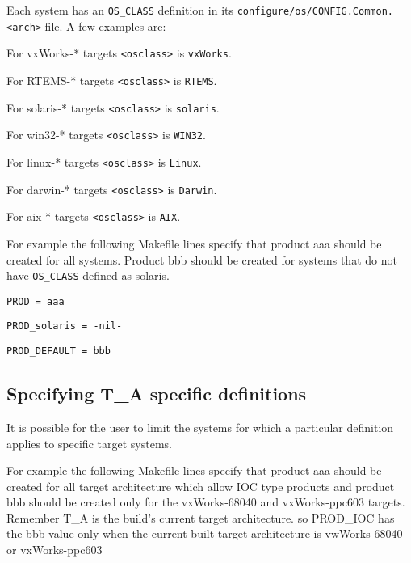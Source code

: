 Each system has an \verb|OS_CLASS| definition in its \verb|configure/os/CONFIG.Common.<arch>| file. A few examples are:

\begin{description}
\item For vxWorks-* targets \verb|<osclass>| is \verb|vxWorks|.

\item For RTEMS-* targets \verb|<osclass>| is \verb|RTEMS|.

\item For solaris-* targets \verb|<osclass>| is \verb|solaris|.

\item For win32-* targets \verb|<osclass>| is \verb|WIN32|.

\item For linux-* targets \verb|<osclass>| is \verb|Linux|.

\item For darwin-* targets \verb|<osclass>| is \verb|Darwin|.

\item For aix-* targets \verb|<osclass>| is \verb|AIX|.

\end{description}

For example the following Makefile lines specify that product aaa should be created for all systems. Product bbb should 
be created for systems that do not have \verb|OS_CLASS| defined as solaris.

\begin{description}
\item \verb|PROD = aaa|
\item \verb|PROD_solaris = -nil-|
\item \verb|PROD_DEFAULT = bbb|
\end{description}
\subsection{Specifying T\_A specific definitions}

It is possible for the user to limit the systems for which a particular definition applies to specific target systems. 

For example the following Makefile lines specify that product aaa should be created for all target architecture which allow 
IOC type products and product bbb should be created only for the vxWorks-68040 and vxWorks-ppc603 targets. 
Remember T\_A is the build's current target architecture. so PROD\_IOC has the bbb value only when the current built 
target architecture is vwWorks-68040 or vxWorks-ppc603

